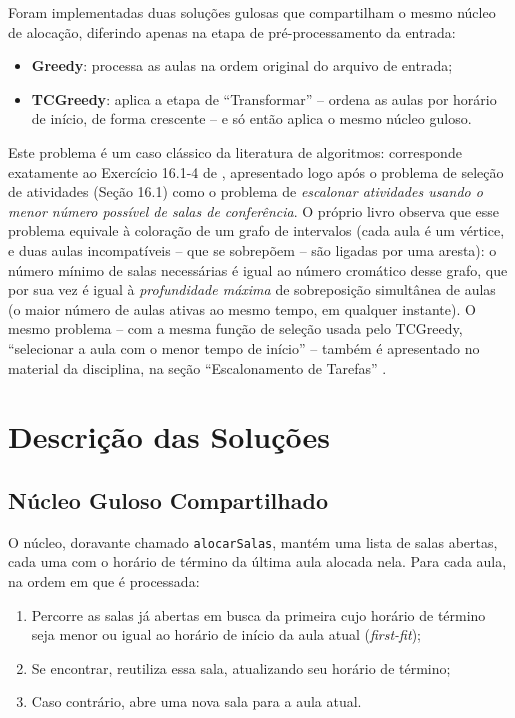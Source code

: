 \documentclass[12pt]{article}
\begin{document}
Foram implementadas duas soluções gulosas que compartilham o mesmo núcleo
de alocação, diferindo apenas na etapa de pré-processamento da entrada:

\begin{itemize}
\item \textbf{Greedy}: processa as aulas na ordem original do arquivo de
  entrada;
\item \textbf{TCGreedy}: aplica a etapa de ``Transformar'' -- ordena as
  aulas por horário de início, de forma crescente -- e só então aplica o
  mesmo núcleo guloso.
\end{itemize}

Este problema é um caso clássico da literatura de algoritmos: corresponde
exatamente ao Exercício 16.1-4 de \cite{cormen:09}, apresentado logo após o
problema de seleção de atividades (Seção 16.1) como o problema de
\emph{escalonar atividades usando o menor número possível de salas de
conferência}. O próprio livro observa que esse problema equivale à
coloração de um grafo de intervalos (cada aula é um vértice, e duas aulas
incompatíveis -- que se sobrepõem -- são ligadas por uma aresta): o número
mínimo de salas necessárias é igual ao número cromático desse grafo, que
por sua vez é igual à \emph{profundidade máxima} de sobreposição
simultânea de aulas (o maior número de aulas ativas ao mesmo tempo, em
qualquer instante). O mesmo problema -- com a mesma função de seleção
usada pelo TCGreedy, ``selecionar a aula com o menor tempo de início'' --
também é apresentado no material da disciplina, na seção ``Escalonamento
de Tarefas'' \cite{brun:26}.

\section{Descrição das Soluções}

\subsection{Núcleo Guloso Compartilhado}
\label{sec:nucleo}

O núcleo, doravante chamado \texttt{alocarSalas}, mantém uma lista de salas
abertas, cada uma com o horário de término da última aula alocada nela.
Para cada aula, na ordem em que é processada:

\begin{enumerate}
\item Percorre as salas já abertas em busca da primeira cujo horário de
  término seja menor ou igual ao horário de início da aula atual
  (\textit{first-fit});
\item Se encontrar, reutiliza essa sala, atualizando seu horário de
  término;
\item Caso contrário, abre uma nova sala para a aula atual.
\end{enumerate}
\end{document}
